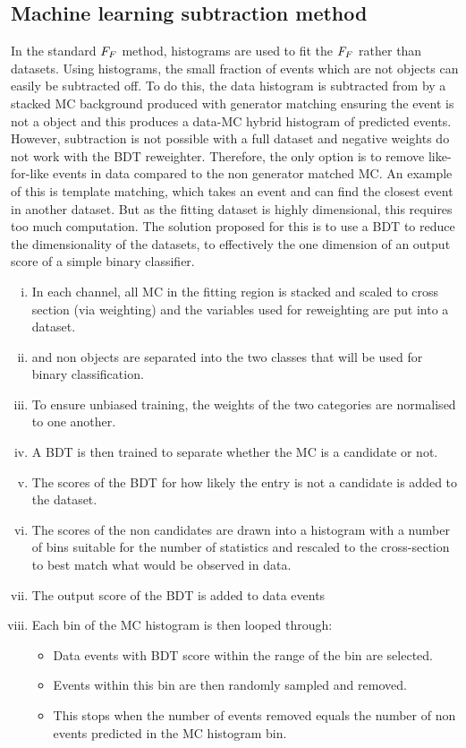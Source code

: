 \subsection{Machine learning subtraction method}

In the standard $F_{F}$ method, histograms are used to fit the $F_{F}$ rather than datasets. 
Using histograms, the small fraction of events which are not \jtth objects can easily be subtracted off. 
To do this, the data histogram is subtracted from by a stacked \ac{MC} background produced with generator matching ensuring the event is not a \jtth object and this produces a data-\ac{MC} hybrid histogram of predicted \jtth events.
However, subtraction is not possible with a full dataset and negative weights do not work with the \ac{BDT} reweighter. 
Therefore, the only option is to remove like-for-like events in data compared to the non \jtth generator matched \ac{MC}.
An example of this is template matching, which takes an event and can find the closest event in another dataset.
But as the fitting dataset is highly dimensional, this requires too much computation.
The solution proposed for this is to use a \ac{BDT} to reduce the dimensionality of the datasets, to effectively the one dimension of an output score of a simple binary classifier. \\

\begin{enumerate}[i)]
  \item In each channel, all \ac{MC} in the fitting region is stacked and scaled to cross section (via weighting) and the variables used for reweighting are put into a dataset.
  \item \jtth and non \jtth objects are separated into the two classes that will be used for binary classification.
  \item To ensure unbiased training, the weights of the two categories are normalised to one another.
  \item A \ac{BDT} is then trained to separate whether the \ac{MC} is a \jtth candidate or not.
  \item The scores of the \ac{BDT} for how likely the entry is not a \jtth candidate is added to the dataset.
  \item The scores of the non \jtth candidates are drawn into a histogram with a number of bins suitable for the number of statistics and rescaled to the cross-section to best match what would be observed in data.
  \item The output score of the \ac{BDT} is added to data events
  \item Each bin of the \ac{MC} histogram is then looped through:
  \begin{itemize}
    \item Data events with \ac{BDT} score within the range of the bin are selected.
    \item Events within this bin are then randomly sampled and removed.
    \item This stops when the number of events removed equals the number of non \jtth events predicted in the \ac{MC} histogram bin.
  \end{itemize}
\end{enumerate} 

